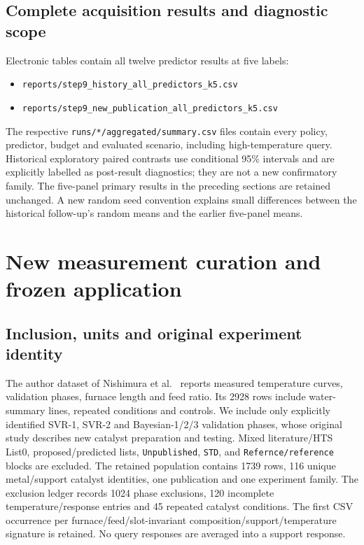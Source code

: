 \subsection{Complete acquisition results and diagnostic scope}

\FloatBarrier
Electronic tables contain all twelve predictor results at five labels:
\begin{itemize}
\item \nolinkurl{reports/step9_history_all_predictors_k5.csv}
\item \nolinkurl{reports/step9_new_publication_all_predictors_k5.csv}
\end{itemize}
The respective \nolinkurl{runs/*/aggregated/summary.csv} files contain every policy, predictor, budget and evaluated scenario, including high-temperature query. Historical exploratory paired contrasts use conditional 95\% intervals and are explicitly labelled as post-result diagnostics; they are not a new confirmatory family. The five-panel primary results in the preceding sections are retained unchanged. A new random seed convention explains small differences between the historical follow-up's random means and the earlier five-panel means.

\section{New measurement curation and frozen application}
\subsection{Inclusion, units and original experiment identity}
The author dataset of Nishimura et al.\ \cite{nishimura2023new} reports measured temperature curves, validation phases, furnace length and feed ratio. Its 2928 rows include water-summary lines, repeated conditions and controls. We include only explicitly identified SVR-1, SVR-2 and Bayesian-1/2/3 validation phases, whose original study describes new catalyst preparation and testing. Mixed literature/HTS List0, proposed/predicted lists, \texttt{Unpublished}, \texttt{STD}, and \texttt{Refernce/reference} blocks are excluded. The retained population contains 1739 rows, 116 unique metal/support catalyst identities, one publication and one experiment family. The exclusion ledger records 1024 phase exclusions, 120 incomplete temperature/response entries and 45 repeated catalyst conditions. The first CSV occurrence per furnace/feed/slot-invariant composition/support/temperature signature is retained. No query responses are averaged into a support response.

